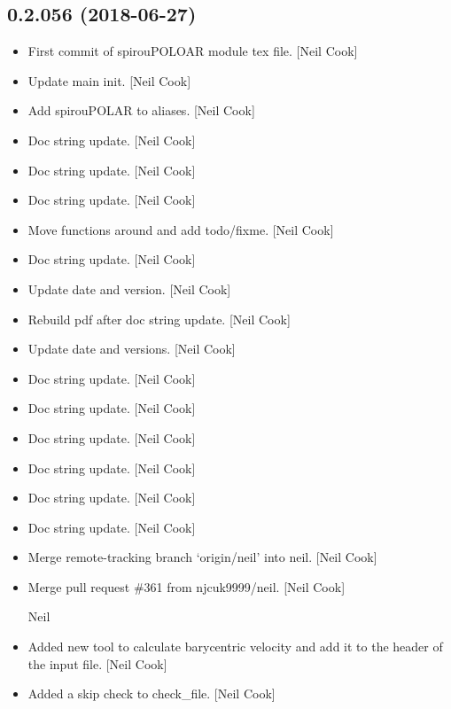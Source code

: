 \documentclass[a4paper,10pt,english]{report}
\begin{document}
\subsection{0.2.056 (2018-06-27)}
\label{\detokenize{misc/changelog:id407}}\begin{itemize}
\item {} 
First commit of spirouPOLOAR module tex file. {[}Neil Cook{]}

\item {} 
Update main init. {[}Neil Cook{]}

\item {} 
Add spirouPOLAR to aliases. {[}Neil Cook{]}

\item {} 
Doc string update. {[}Neil Cook{]}

\item {} 
Doc string update. {[}Neil Cook{]}

\item {} 
Doc string update. {[}Neil Cook{]}

\item {} 
Move functions around and add todo/fixme. {[}Neil Cook{]}

\item {} 
Doc string update. {[}Neil Cook{]}

\item {} 
Update date and version. {[}Neil Cook{]}

\item {} 
Rebuild pdf after doc string update. {[}Neil Cook{]}

\item {} 
Update date and versions. {[}Neil Cook{]}

\item {} 
Doc string update. {[}Neil Cook{]}

\item {} 
Doc string update. {[}Neil Cook{]}

\item {} 
Doc string update. {[}Neil Cook{]}

\item {} 
Doc string update. {[}Neil Cook{]}

\item {} 
Doc string update. {[}Neil Cook{]}

\item {} 
Doc string update. {[}Neil Cook{]}

\item {} 
Merge remote-tracking branch ‘origin/neil’ into neil. {[}Neil Cook{]}

\item {} 
Merge pull request \#361 from njcuk9999/neil. {[}Neil Cook{]}

Neil

\item {} 
Added new tool to calculate barycentric velocity and add it to the
header of the input file. {[}Neil Cook{]}

\item {} 
Added a skip check to check\_file. {[}Neil Cook{]}

\end{itemize}
\end{document}
